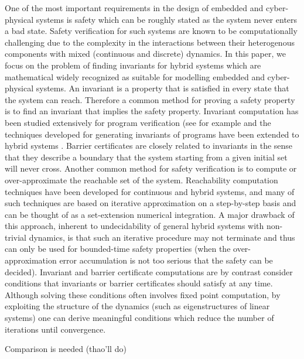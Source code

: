 One of the most important requirements in the design of embedded and cyber-physical systems is safety which can be roughly stated as the system never enters a bad state. Safety verification for such systems are known to be computationally challenging due to the complexity in the interactions between their heterogenous components with mixed (continuous and discrete) dynamics. In this paper, we focus on the problem of finding invariants for hybrid systems which are mathematical widely recognized as suitable for modelling embedded and cyber-physical systems. An invariant is a property that is satisfied in every state that the system can reach. 
Therefore a common method for proving a safety property is to find an invariant that implies the safety property. Invariant computation has been studied extensively for program verification (see for example \cite{CousotHalbwachs1978,Bensalem2000,Tiwari2001,SriramSipma2004,colonSriramSipma2003,Fluctuat} and the techniques developed for generating invariants of programs have been extended to hybrid systems \cite{Sriram,Jeannet,tiwariRodriguezCarbonellPolynomialInvariants,Goubault,HybridFluctuat,differentialInvariantPlatzer,Gawlitza}. Barrier certificates \cite{prajna2004safety} are closely related to invariants in the sense that they describe a boundary that the system starting from a given initial set will never cross. Another common method for safety verification is to compute or over-approximate the reachable set of the system. Reachability computation techniques have been developed for continuous and hybrid systems, and many of such techniques are based on iterative approximation on a step-by-step basis and can be thought of as a set-extension numerical integration. A major drawback of this approach, inherent to undecidability of general hybrid systems with non-trivial dynamics, is that such an iterative procedure may not terminate and thus can only be used for bounded-time safety properties (when the over-approximation error accumulation is not too serious that the safety can be decided). Invariant and barrier certificate computations are by contrast consider conditions that invariants or barrier certificates should satisfy at any time. Although solving these conditions often involves fixed point computation, by exploiting the structure of the dynamics (such as eigenstructures of linear systems) one can derive meaningful conditions which reduce the number of iterations until convergence.

Comparison is needed (thao'll do)


